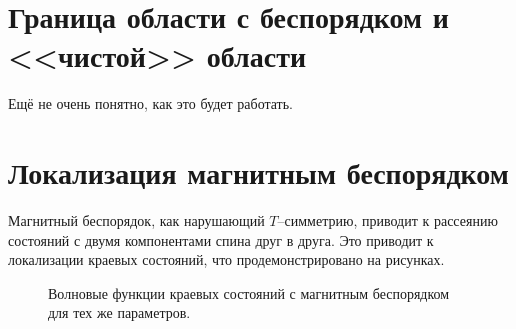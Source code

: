  \section{Граница области с беспорядком и <<чистой>> области}
 Ещё не очень понятно, как это будет работать. 
\section{Локализация магнитным беспорядком}
Магнитный беспорядок, как нарушающий $T$--симметрию, приводит к рассеянию состояний
с двумя компонентами спина друг в друга. Это приводит к локализации краевых состояний,
что продемонстрировано на рисунках.
\begin{figure}[h]
    \centering
    \begin{minipage}[h]{0.9\linewidth}
    \end{minipage}
    \begin{minipage}[h]{0.9\linewidth}
    \end{minipage}
    \begin{minipage}[h]{0.9\linewidth}
    \end{minipage}
    \caption{
        Волновые функции краевых состояний с магнитным беспорядком 
        для тех же параметров.
        }
\end{figure}
